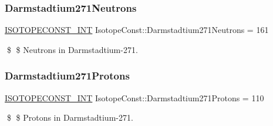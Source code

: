 \subsubsection{\texorpdfstring{Darmstadtium271\+Neutrons}{Darmstadtium271Neutrons}}
{\footnotesize\ttfamily \mbox{\hyperlink{group___isotope_const-_macros_ga5f18360b3e99483a35c32d789e62621c}{I\+S\+O\+T\+O\+P\+E\+C\+O\+N\+S\+T\+\_\+\+I\+NT}} Isotope\+Const\+::\+Darmstadtium271\+Neutrons = 161}

\$ \$ Neutrons in Darmstadtium-\/271. \mbox{\label{group___isotope_const-_darmstadtium-_ds271_gade86ed138ecce12e1c50b889ae345b4a}} 
\subsubsection{\texorpdfstring{Darmstadtium271\+Protons}{Darmstadtium271Protons}}
{\footnotesize\ttfamily \mbox{\hyperlink{group___isotope_const-_macros_ga5f18360b3e99483a35c32d789e62621c}{I\+S\+O\+T\+O\+P\+E\+C\+O\+N\+S\+T\+\_\+\+I\+NT}} Isotope\+Const\+::\+Darmstadtium271\+Protons = 110}

\$ \$ Protons in Darmstadtium-\/271. 